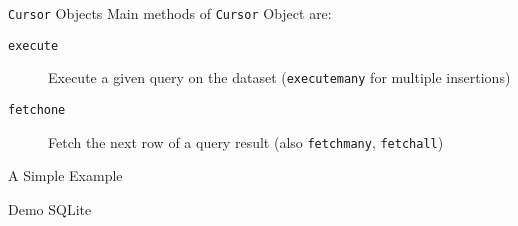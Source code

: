 \begin{frame}{\texttt{Cursor} Objects}\label{dbapi:cursor}
  Main methods of \texttt{Cursor} Object are:
  \begin{description}
    \item[\texttt{execute}] Execute a given query on the dataset (\texttt{executemany} for multiple insertions)
    \item[\texttt{fetchone}] Fetch the next row of a query result (also \texttt{fetchmany}, \texttt{fetchall})
  \end{description} 

\end{frame}

\begin{frame}{A Simple Example}
\end{frame}

\begin{frame}{Demo SQLite}
\end{frame}
